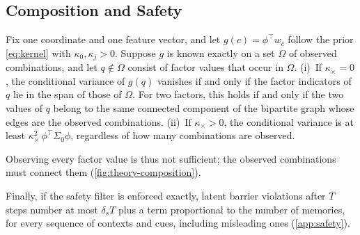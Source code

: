 \subsection{Composition and Safety}

\begin{proposition}\label{prop:composition}
Fix one coordinate and one feature vector, and let $g(c)=\phi^\top w_c$ follow the prior \cref{eq:kernel} with $\kappa_0,\kappa_j>0$. Suppose $g$ is known exactly on a set $\Omega$ of observed combinations, and let $q\notin\Omega$ consist of factor values that occur in $\Omega$.
(i)~If $\kappa_\times=0$, the conditional variance of $g(q)$ vanishes if and only if the factor indicators of $q$ lie in the span of those of $\Omega$. For two factors, this holds if and only if the two values of $q$ belong to the same connected component of the bipartite graph whose edges are the observed combinations.
(ii)~If $\kappa_\times>0$, the conditional variance is at least $\kappa_\times^2\,\phi^\top\Sigma_0\phi$, regardless of how many combinations are observed.
\end{proposition}

Observing every factor value is thus not sufficient; the observed combinations must connect them (\cref{fig:theory-composition}).

Finally, if the safety filter is enforced exactly, latent barrier violations after $T$ steps number at most $\delta_sT$ plus a term proportional to the number of memories, for every sequence of contexts and cues, including misleading ones (\cref{app:safety}).
